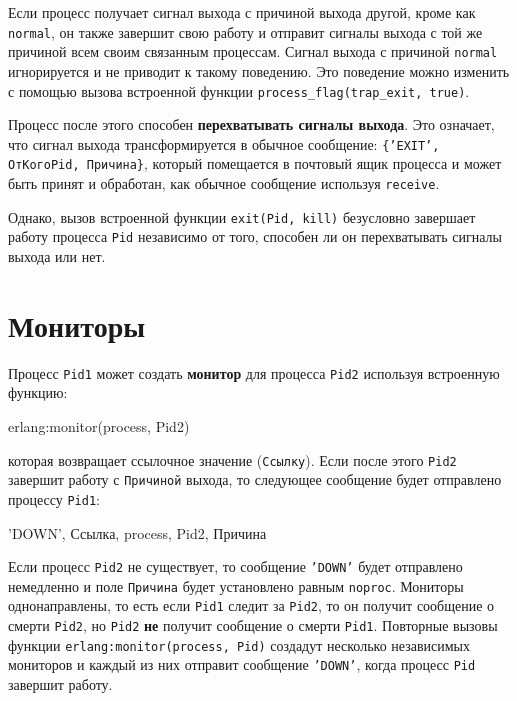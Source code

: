 Если процесс получает сигнал выхода с причиной выхода другой, кроме как 
\texttt{normal}, он также завершит свою работу и отправит сигналы выхода с той же
причиной всем своим связанным процессам.  Сигнал выхода с причиной \texttt{normal}
игнорируется и не приводит к такому поведению.  Это поведение можно изменить с
помощью вызова встроенной функции \texttt{process\_flag(trap\_exit, true)}.

Процесс после этого способен \textbf{перехватывать сигналы выхода}.  Это означает,
что сигнал выхода трансформируется в обычное сообщение: \texttt{\{'EXIT', 
	ОтКогоPid, Причина\}}, который помещается в почтовый ящик процесса и может
быть принят и обработан, как обычное сообщение используя \texttt{receive}.

Однако, вызов встроенной функции \texttt{exit(Pid, kill)} безусловно завершает 
работу процесса \texttt{Pid} независимо от того, способен ли он перехватывать 
сигналы выхода или нет.


\section{Мониторы}

Процесс \texttt{Pid1} может создать \textbf{монитор} для процесса \texttt{Pid2} 
используя встроенную функцию:

\begin{erlang}
erlang:monitor(process, Pid2)
\end{erlang}

которая возвращает ссылочное значение (\texttt{Ссылку}). Если после этого
\texttt{Pid2} завершит работу с \texttt{Причиной} выхода, то следующее сообщение 
будет отправлено процессу \texttt{Pid1}:

\begin{erlangru}
{'DOWN', Ссылка, process, Pid2, Причина}
\end{erlangru}

Если процесс \texttt{Pid2} не существует, то сообщение \texttt{'DOWN'} будет 
отправлено немедленно и поле \texttt{Причина} будет установлено равным 
\texttt{noproc}.  Мониторы однонаправлены, то есть если \texttt{Pid1} следит за 
\texttt{Pid2}, то он получит сообщение о смерти \texttt{Pid2}, но \texttt{Pid2}
\textbf{не} получит сообщение о смерти \texttt{Pid1}. Повторные вызовы функции 
\linebreak
\texttt{erlang:monitor(process, Pid)} создадут несколько независимых мониторов и
каждый из них отправит сообщение \texttt{'DOWN'}, когда процесс \texttt{Pid}
завершит работу.

